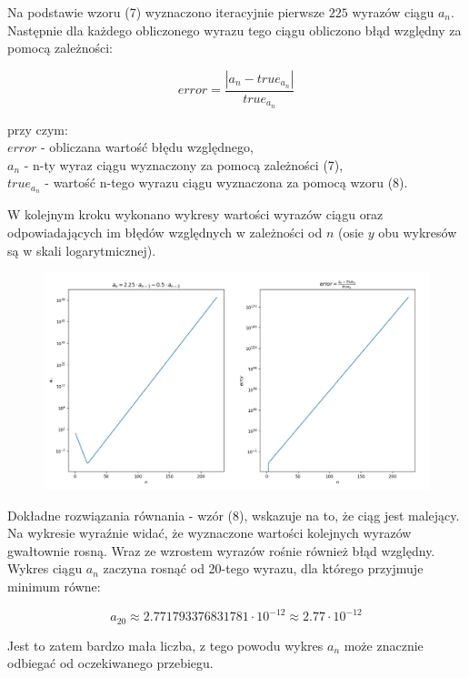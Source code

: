 \documentclass{article}
\begin{document}
	Na podstawie wzoru (7) wyznaczono iteracyjnie pierwsze $225$ wyrazów ciągu $a_n$. Następnie dla każdego obliczonego wyrazu tego ciągu obliczono błąd względny za pomocą zależności:
	
	\begin{equation}
		error = \frac{| a_n - true_{a_n} |}{true_{a_n}}
	\end{equation}
	
	przy czym: \\ 
	$error$ - obliczana wartość błędu względnego,  \\
	$a_n$ - n-ty wyraz ciągu wyznaczony za pomocą zależności (7), \\
	$true_{a_n}$ - wartość n-tego wyrazu ciągu wyznaczona za pomocą wzoru (8).
	\newline
	\newline
	
	W kolejnym kroku wykonano wykresy wartości wyrazów ciągu oraz odpowiadających im błędów względnych w zależności od $n$ (osie $y$ obu wykresów są w skali logarytmicznej).
	
	\begin{figure}[h]
    		\centering
  		\includegraphics[scale = 0.5]{zad2.png}
	\end{figure}
	
	Dokładne rozwiązania równania - wzór (8), wskazuje na to, że ciąg jest malejący. Na wykresie wyraźnie widać, że wyznaczone wartości kolejnych wyrazów gwałtownie rosną. Wraz ze wzrostem wyrazów rośnie również błąd względny. \newline \newline
	Wykres ciągu $a_n$ zaczyna rosnąć od 20-tego wyrazu, dla którego przyjmuje minimum równe:
	
	$$a_{20} \approx 2.771793376831781 \cdot 10^{-12} \approx 2.77 \cdot 10^{-12}$$
	
	Jest to zatem bardzo mała liczba, z tego powodu wykres $a_n$ może znacznie odbiegać od oczekiwanego przebiegu.
	
	
	
	
	
	
	
	
	
	
	
	
	
	
	
	
	
	
	
	
	
	
	
	
	
	
	
	
	
	
	
\end{document}
